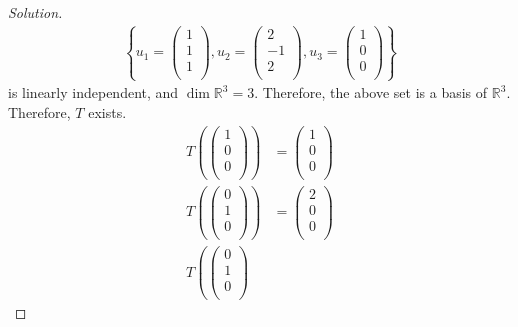 \documentclass[fleqn, a4paper, 12pt]{article}
\theoremstyle{definition}
\theoremstyle{theorem}
\newenvironment{solution}
{\begin{proof}[Solution]\let\qed\relax}
	{\end{proof}}
\begin{document}
\begin{solution}
	\begin{align*}
		\left\lbrace
			u_1 =
			\begin{pmatrix}
				1\\
				1\\
				1\\
			\end{pmatrix}
			,
			u_2 =
			\begin{pmatrix}
				2\\
				-1\\
				2\\
			\end{pmatrix}
			,
			u_3 =
			\begin{pmatrix}
				1\\
				0\\
				0\\
			\end{pmatrix}
		\right\rbrace
	\end{align*}
	is linearly independent, and $\dim \mathbb{R}^3 = 3$. Therefore, the above set is a basis of $\mathbb{R}^3$.\\
	Therefore, $T$ exists.
	\begin{align*}
		T
		\left(
			\begin{pmatrix}
				1\\
				0\\
				0\\
			\end{pmatrix}
		\right)
		&= 
		\begin{pmatrix}
			1\\
			0\\
			0\\
		\end{pmatrix}\\
		T
		\left(
			\begin{pmatrix}
				0\\
				1\\
				0\\
			\end{pmatrix}
		\right)
		&= 
		\begin{pmatrix}
			2\\
			0\\
			0\\
		\end{pmatrix}\\
		T
		\left(
			\begin{pmatrix}
				0\\
				1\\
				0\\

\end{pmatrix}
\end{align*}
\end{solution}
\end{document}
